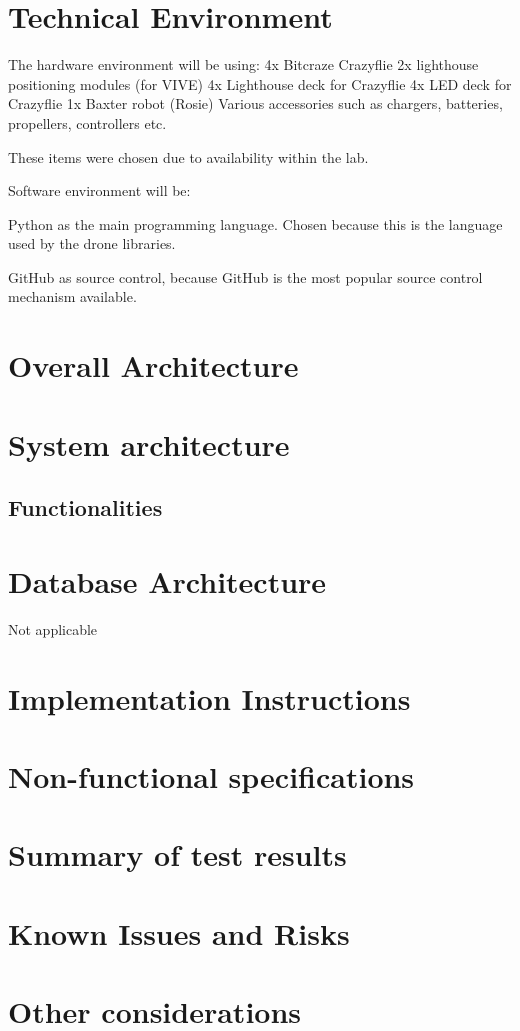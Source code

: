 \documentclass{article}
\begin{document}
  \section {Technical Environment}

  The hardware environment will be using:
  4x Bitcraze Crazyflie
  2x lighthouse positioning modules (for VIVE)
  4x Lighthouse deck for Crazyflie 
  4x LED deck for Crazyflie 
  1x Baxter robot (Rosie)
  Various accessories such as chargers, batteries, propellers, controllers etc.

  These items were chosen due to availability within the lab.

  Software environment will be:

  Python as the main programming language. Chosen because this is the language used by the
  drone libraries.
   
  GitHub as source control, because GitHub is the most popular source control mechanism 
  available.

  \section {Overall Architecture}


  \section {System architecture}

  \subsection {Functionalities}
  
  \section {Database Architecture}

  Not applicable

  \section {Implementation Instructions}
  
  \section {Non-functional specifications}
  \section {Summary of test results}
  \section {Known Issues and Risks}

  \section {Other considerations}
  
\end{document}
